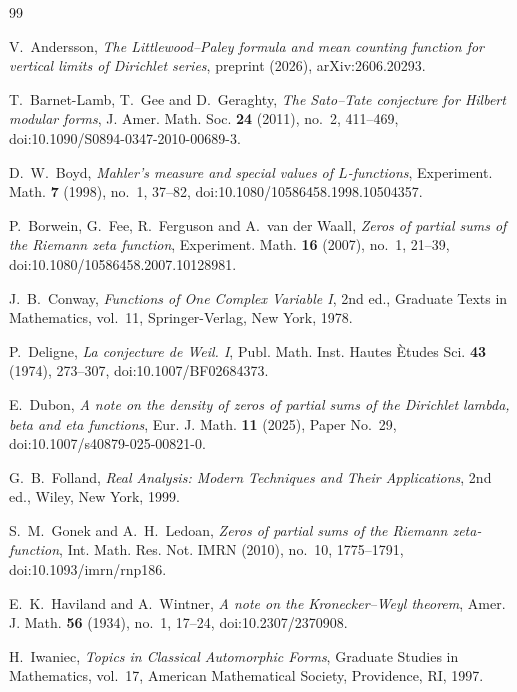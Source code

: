 \documentclass[11pt]{article}
\theoremstyle{definition}
\newcommand{\1}{\mathbf 1}
\begin{document}
\begin{thebibliography}{99}
\small

V.~Andersson,
\textit{The Littlewood--Paley formula and mean counting function for vertical limits of Dirichlet series},
preprint (2026), arXiv:2606.20293.

T.~Barnet-Lamb, T.~Gee and D.~Geraghty,
\textit{The Sato--Tate conjecture for Hilbert modular forms},
J. Amer. Math. Soc. \textbf{24} (2011), no.~2, 411--469,
doi:10.1090/S0894-0347-2010-00689-3.

D.~W.~Boyd,
\textit{Mahler's measure and special values of $L$-functions},
Experiment. Math. \textbf{7} (1998), no.~1, 37--82,
doi:10.1080/10586458.1998.10504357.

P.~Borwein, G.~Fee, R.~Ferguson and A.~van der Waall,
\textit{Zeros of partial sums of the Riemann zeta function},
Experiment. Math. \textbf{16} (2007), no.~1, 21--39,
doi:10.1080/10586458.2007.10128981.

J.~B.~Conway,
\textit{Functions of One Complex Variable I},
2nd ed., Graduate Texts in Mathematics, vol.~11,
Springer-Verlag, New York, 1978.

P.~Deligne,
\textit{La conjecture de Weil. I},
Publ. Math. Inst. Hautes \`Etudes Sci. \textbf{43} (1974), 273--307,
doi:10.1007/BF02684373.

E.~Dubon,
\textit{A note on the density of zeros of partial sums of the Dirichlet lambda, beta and eta functions},
Eur. J. Math. \textbf{11} (2025), Paper No.~29,
doi:10.1007/s40879-025-00821-0.

G.~B.~Folland,
\textit{Real Analysis: Modern Techniques and Their Applications},
2nd ed., Wiley, New York, 1999.

S.~M.~Gonek and A.~H.~Ledoan,
\textit{Zeros of partial sums of the Riemann zeta-function},
Int. Math. Res. Not. IMRN (2010), no.~10, 1775--1791,
doi:10.1093/imrn/rnp186.

E.~K.~Haviland and A.~Wintner,
\textit{A note on the Kronecker--Weyl theorem},
Amer. J. Math. \textbf{56} (1934), no.~1, 17--24,
doi:10.2307/2370908.

H.~Iwaniec,
\textit{Topics in Classical Automorphic Forms},
Graduate Studies in Mathematics, vol.~17,
American Mathematical Society, Providence, RI, 1997.


\end{thebibliography}
\end{document}
